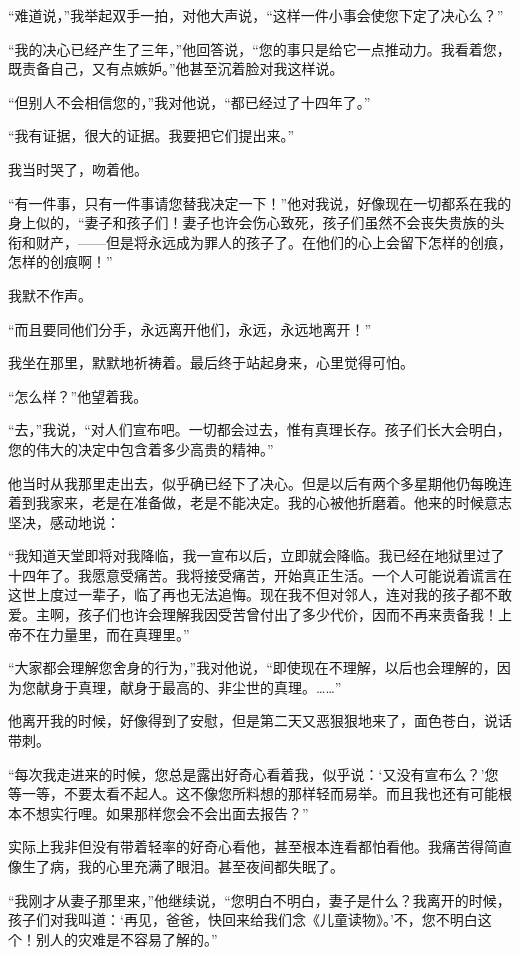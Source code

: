 \par “难道说，”我举起双手一拍，对他大声说，“这样一件小事会使您下定了决心么？”
\par “我的决心已经产生了三年，”他回答说，“您的事只是给它一点推动力。我看着您，既责备自己，又有点嫉妒。”他甚至沉着脸对我这样说。
\par “但别人不会相信您的，”我对他说，“都已经过了十四年了。”
\par “我有证据，很大的证据。我要把它们提出来。”
\par 我当时哭了，吻着他。
\par “有一件事，只有一件事请您替我决定一下！”他对我说，好像现在一切都系在我的身上似的，“妻子和孩子们！妻子也许会伤心致死，孩子们虽然不会丧失贵族的头衔和财产，——但是将永远成为罪人的孩子了。在他们的心上会留下怎样的创痕，怎样的创痕啊！”
\par 我默不作声。
\par “而且要同他们分手，永远离开他们，永远，永远地离开！”
\par 我坐在那里，默默地祈祷着。最后终于站起身来，心里觉得可怕。
\par “怎么样？”他望着我。
\par “去，”我说，“对人们宣布吧。一切都会过去，惟有真理长存。孩子们长大会明白，您的伟大的决定中包含着多少高贵的精神。”
\par 他当时从我那里走出去，似乎确已经下了决心。但是以后有两个多星期他仍每晚连着到我家来，老是在准备做，老是不能决定。我的心被他折磨着。他来的时候意志坚决，感动地说：
\par “我知道天堂即将对我降临，我一宣布以后，立即就会降临。我已经在地狱里过了十四年了。我愿意受痛苦。我将接受痛苦，开始真正生活。一个人可能说着谎言在这世上度过一辈子，临了再也无法追悔。现在我不但对邻人，连对我的孩子都不敢爱。主啊，孩子们也许会理解我因受苦曾付出了多少代价，因而不再来责备我！上帝不在力量里，而在真理里。”
\par “大家都会理解您舍身的行为，”我对他说，“即使现在不理解，以后也会理解的，因为您献身于真理，献身于最高的、非尘世的真理。……”
\par 他离开我的时候，好像得到了安慰，但是第二天又恶狠狠地来了，面色苍白，说话带刺。
\par “每次我走进来的时候，您总是露出好奇心看着我，似乎说：‘又没有宣布么？’您等一等，不要太看不起人。这不像您所料想的那样轻而易举。而且我也还有可能根本不想实行哩。如果那样您会不会出面去报告？”
\par 实际上我非但没有带着轻率的好奇心看他，甚至根本连看都怕看他。我痛苦得简直像生了病，我的心里充满了眼泪。甚至夜间都失眠了。
\par “我刚才从妻子那里来，”他继续说，“您明白不明白，妻子是什么？我离开的时候，孩子们对我叫道：‘再见，爸爸，快回来给我们念《儿童读物》。’不，您不明白这个！别人的灾难是不容易了解的。”
